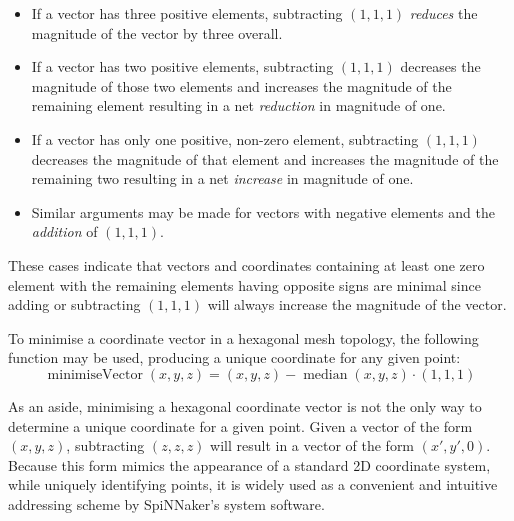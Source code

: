 	\begin{itemize}
	
		\item If a vector has three positive elements, subtracting $(1,1,1)$
		\emph{reduces} the magnitude of the vector by three overall.
		
		\item If a vector has two positive elements, subtracting $(1,1,1)$
		decreases the magnitude of those two elements and increases the magnitude
		of the remaining element resulting in a net \emph{reduction} in magnitude
		of one.
		
		\item If a vector has only one positive, non-zero element, subtracting
		$(1,1,1)$ decreases the magnitude of that element and increases the
		magnitude of the remaining two resulting in a net \emph{increase} in
		magnitude of one.
		
		\item Similar arguments may be made for vectors with negative elements and
		the \emph{addition} of $(1,1,1)$.
	
	\end{itemize}
	
	These cases indicate that vectors and coordinates containing at least one
	zero element with the remaining elements having opposite signs are minimal
	since adding or subtracting $(1,1,1)$ will always increase the magnitude of
	the vector.
	
	To minimise a coordinate vector in a hexagonal mesh topology, the following
	function may be used, producing a unique coordinate for any given point:
	\begin{equation*}
		\operatorname{minimiseVector}(x,y,z) =
			(x,y,z) - \operatorname{median}(x,y,z) \cdot (1,1,1)
	\end{equation*}
	
	As an aside, minimising a hexagonal coordinate vector is not the only way to
	determine a unique coordinate for a given point. Given a vector of the form
	$(x, y, z)$, subtracting $(z,z,z)$ will result in a vector of the form $(x',
	y', 0)$. Because this form mimics the appearance of a standard 2D coordinate
	system, while uniquely identifying points, it is widely used as a convenient
	and intuitive addressing scheme by SpiNNaker's system software.
